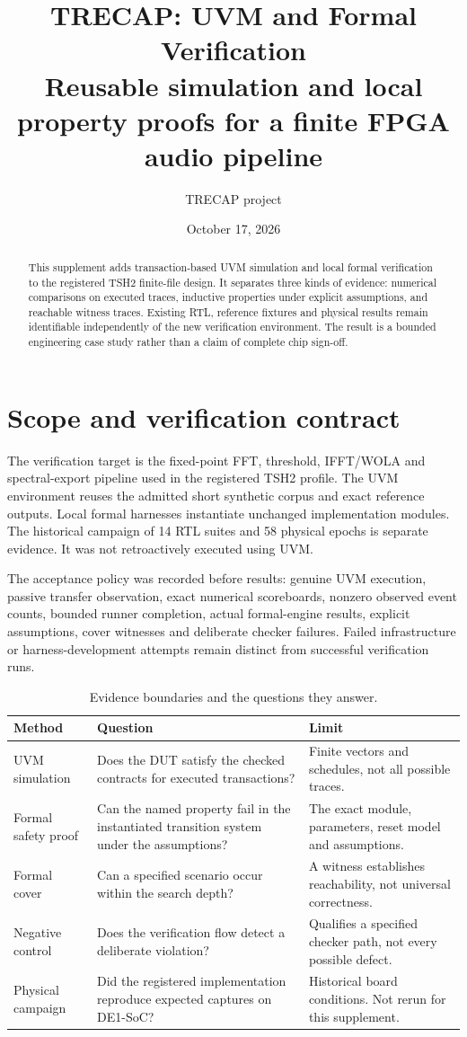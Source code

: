 \documentclass[11pt,letterpaper]{article}
\title{\LARGE\bfseries TRECAP: UVM and Formal Verification\\[0.5em]\large Reusable simulation and local property proofs for a finite FPGA audio pipeline}
\author{TRECAP project}
\date{October 17, 2026}
\begin{document}
\maketitle
\begin{abstract}
This supplement adds transaction-based UVM simulation and local formal verification to the registered TSH2 finite-file design. It separates three kinds of evidence: numerical comparisons on executed traces, inductive properties under explicit assumptions, and reachable witness traces. Existing RTL, reference fixtures and physical results remain identifiable independently of the new verification environment. The result is a bounded engineering case study rather than a claim of complete chip sign-off.
\end{abstract}


\clearpage
\section{Scope and verification contract}
The verification target is the fixed-point FFT, threshold, IFFT/WOLA and spectral-export pipeline used in the registered TSH2 profile. The UVM environment reuses the admitted short synthetic corpus and exact reference outputs. Local formal harnesses instantiate unchanged implementation modules. The historical campaign of 14 RTL suites and 58 physical epochs is separate evidence. It was not retroactively executed using UVM.

The acceptance policy was recorded before results: genuine UVM execution, passive transfer observation, exact numerical scoreboards, nonzero observed event counts, bounded runner completion, actual formal-engine results, explicit assumptions, cover witnesses and deliberate checker failures. Failed infrastructure or harness-development attempts remain distinct from successful verification runs.

\begin{table}[htbp]\centering
\caption{Evidence boundaries and the questions they answer.}
\begin{tabularx}{\linewidth}{P{1.25in}LL}\toprule
Method & Question & Limit\\\midrule
UVM simulation & Does the DUT satisfy the checked contracts for executed transactions? & Finite vectors and schedules, not all possible traces.\\
Formal safety proof & Can the named property fail in the instantiated transition system under the assumptions? & The exact module, parameters, reset model and assumptions.\\
Formal cover & Can a specified scenario occur within the search depth? & A witness establishes reachability, not universal correctness.\\
Negative control & Does the verification flow detect a deliberate violation? & Qualifies a specified checker path, not every possible defect.\\
Physical campaign & Did the registered implementation reproduce expected captures on DE1-SoC? & Historical board conditions. Not rerun for this supplement.\\\bottomrule
\end{tabularx}\end{table}
\end{document}
